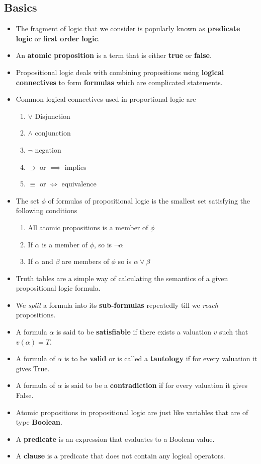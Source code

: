 \documentclass[a4paper]{article}
\begin{document}
\subsection{Basics}
\begin{itemize}
    \item The fragment of logic that we consider is popularly known as \textbf{predicate logic} or \textbf{first order logic}.
    \item An \textbf{atomic proposition} is a term that is either \textbf{true} or \textbf{false}.
    \item Propositional logic deals with combining propositions using \textbf{logical connectives} to form \textbf{formulas} which are complicated statements.
    \item Common logical connectives used in proportional logic are
    \begin{enumerate}
        \item $\lor$ Disjunction
        \item $\land$ conjunction
        \item $\neg$ negation
        \item $\supset$ or $\implies$ implies
        \item $\equiv$ or $\iff$ equivalence
    \end{enumerate}
    \item The set $\phi$ of formulas of propositional logic is the smallest set satisfying the following conditions
    \begin{enumerate}
        \item All atomic propositions is a member of $\phi$
        \item If $\alpha$ is a member of $\phi$, so is $\neg \alpha$
        \item If $\alpha$ and $\beta$ are members of $\phi$ so is $\alpha \lor \beta$
    \end{enumerate}
    \item Truth tables are a simple way of calculating the semantics of a given propositional logic formula.
    \item We \textit{split} a formula into its \textbf{sub-formulas} repeatedly till we \textit{reach} propositions.
    \item A formula $\alpha$ is said to be \textbf{satisfiable} if there exists a valuation $v$ such that $v(\alpha)=T$.
    \item A formula of $\alpha$ is to be \textbf{valid} or is called a \textbf{tautology} if for every valuation it gives True.
    \item A formula of $\alpha$ is said to be a \textbf{contradiction} if for every valuation it gives False.
    \item Atomic propositions in propositional logic are just like variables that are of type \textbf{Boolean}.
    \item A \textbf{predicate} is an expression that evaluates to a Boolean value.
    \item A \textbf{clause} is a predicate that does not contain any logical operators.
\end{itemize}
\end{document}
